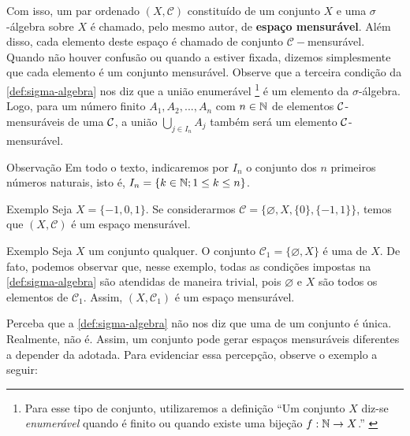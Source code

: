 Com isso, um par ordenado $(X, \mathcal{C})$  constituído de um conjunto $X$ e uma $\sigma$-álgebra sobre $X$ é chamado, pelo mesmo autor, de  \textbf{espaço mensurável}.
Além disso, cada elemento deste espaço é chamado de conjunto $\mathcal{C}-$mensurável.
Quando não houver confusão ou quando a \sigal estiver fixada, dizemos simplesmente que cada elemento é um conjunto mensurável. 
Observe que a terceira condição da \ref{def:sigma-algebra} nos diz que a união enumerável
%
\footnote{Para esse tipo de conjunto, utilizaremos a definição \enquote{Um conjunto $X$ diz-se \textit{enumerável} quando é finito ou quando existe uma bijeção $f : \operatorname{\mathbb{N}} \to X$.} \cite[p.48]{elon}}
%
é um elemento da $\sigma$-álgebra.
Logo, para um número finito $A_1, A_2, ..., A_n$ com $n \in \operatorname{\mathbb{N}}$ de elementos $\operatorname{\mathcal{C}}$-mensuráveis de uma \sigal $\operatorname{\mathcal{C}}$, a união $\displaystyle \bigcup_{j \in I_n} A_j$ também será um elemento $\operatorname{\mathcal{C}}$-mensurável.

\begin{env}{Observação}
	Em todo o texto, indicaremos por $I_n$ o conjunto dos $n$ primeiros números naturais, isto é, $I_n = \{k \in \operatorname{\mathbb{N}}; 1 \leq k \leq n\}$.
\end{env}
\begin{env}{Exemplo}
	\label{ex:Primeiro Exemplo Sigma Algebra}
    Seja $X = \{-1,0,1\}$. Se considerarmos $\mathcal{C} = \{\varnothing, X, \{0\}, \{-1,1\}\}$, temos que $(X, \mathcal{C})$ é um espaço mensurável.
    \vspace{-0.2cm}
\end{env}
%
\begin{env}{Exemplo}
	\label{ex:sigma-trivial}
	Seja $X$ um conjunto qualquer.
	O conjunto $\mathcal{C}_1 = \{\varnothing, X\}$ é uma \sigal de $X$.
	De fato, podemos observar que, nesse exemplo, todas as condições impostas na  \ref{def:sigma-algebra} são atendidas de maneira trivial, pois 
	$\varnothing$ e $X$ são todos os elementos de $\mathcal{C}_1$. 
	Assim,  $(X, \mathcal{C}_1)$ é um espaço mensurável.
\vspace{-0.2cm}
\end{env}

	Perceba que a \ref{def:sigma-algebra} não nos diz que uma \sigal de um conjunto é única.
Realmente, não é. 
Assim, um conjunto pode gerar espaços mensuráveis diferentes a depender da \sigal adotada.
Para evidenciar essa percepção, observe o exemplo a seguir:

